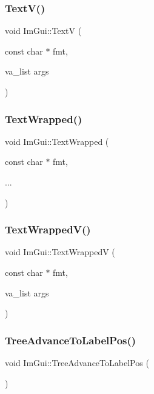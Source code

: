 \subsubsection{\texorpdfstring{Text\+V()}{TextV()}}
{\footnotesize\ttfamily void Im\+Gui\+::\+TextV (\begin{DoxyParamCaption}\item[{const char $\ast$}]{fmt,  }\item[{va\+\_\+list}]{args }\end{DoxyParamCaption})}

\mbox{\label{namespace_im_gui_ad57bb15c599e73b2ccc7c0f7de6e5823}} 
\subsubsection{\texorpdfstring{Text\+Wrapped()}{TextWrapped()}}
{\footnotesize\ttfamily void Im\+Gui\+::\+Text\+Wrapped (\begin{DoxyParamCaption}\item[{const char $\ast$}]{fmt,  }\item[{}]{... }\end{DoxyParamCaption})}

\mbox{\label{namespace_im_gui_a9019a388cd0c410bcb3d3ae63a008123}} 
\subsubsection{\texorpdfstring{Text\+Wrapped\+V()}{TextWrappedV()}}
{\footnotesize\ttfamily void Im\+Gui\+::\+Text\+WrappedV (\begin{DoxyParamCaption}\item[{const char $\ast$}]{fmt,  }\item[{va\+\_\+list}]{args }\end{DoxyParamCaption})}

\mbox{\label{namespace_im_gui_a54e15c2f65cea3aeddd66b5dcfb45716}} 
\subsubsection{\texorpdfstring{Tree\+Advance\+To\+Label\+Pos()}{TreeAdvanceToLabelPos()}}
{\footnotesize\ttfamily void Im\+Gui\+::\+Tree\+Advance\+To\+Label\+Pos (\begin{DoxyParamCaption}{ }\end{DoxyParamCaption})}

